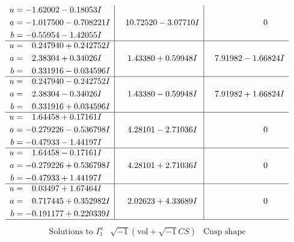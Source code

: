 \documentclass[1p]{elsarticle_modified}
\theoremstyle{definition}
\newcommand{\I}{\sqrt{-1}}
\begin{document}
$$\begin{array}{c|c|c}
\begin{aligned}
u &= -1.62002 - 0.18053 I \\
a &= -1.017500 - 0.708221 I \\
b &= -0.55954 - 1.42055 I\end{aligned}
 & \phantom{-}10.72520 - 3.07710 I & \phantom{-0.000000 } 0 \\ \hline\begin{aligned}
u &= \phantom{-}0.247940 + 0.242752 I \\
a &= \phantom{-}2.38304 + 0.34026 I \\
b &= \phantom{-}0.331916 - 0.034596 I\end{aligned}
 & \phantom{-}1.43380 + 0.59948 I & \phantom{-}7.91982 - 1.66824 I \\ \hline\begin{aligned}
u &= \phantom{-}0.247940 - 0.242752 I \\
a &= \phantom{-}2.38304 - 0.34026 I \\
b &= \phantom{-}0.331916 + 0.034596 I\end{aligned}
 & \phantom{-}1.43380 - 0.59948 I & \phantom{-}7.91982 + 1.66824 I \\ \hline\begin{aligned}
u &= \phantom{-}1.64458 + 0.17161 I \\
a &= -0.279226 - 0.536798 I \\
b &= -0.47933 - 1.44197 I\end{aligned}
 & \phantom{-}4.28101 - 2.71036 I & \phantom{-0.000000 } 0 \\ \hline\begin{aligned}
u &= \phantom{-}1.64458 - 0.17161 I \\
a &= -0.279226 + 0.536798 I \\
b &= -0.47933 + 1.44197 I\end{aligned}
 & \phantom{-}4.28101 + 2.71036 I & \phantom{-0.000000 } 0 \\ \hline\begin{aligned}
u &= \phantom{-}0.03497 + 1.67464 I \\
a &= \phantom{-}0.717445 + 0.352982 I \\
b &= -0.191177 + 0.220339 I\end{aligned}
 & \phantom{-}2.02623 + 4.33689 I & \phantom{-0.000000 } 0\\
 \hline 
 \end{array}$$\newpage$$\begin{array}{c|c|c}  
\text{Solutions to }I^u_{1}& \I (\text{vol} + \sqrt{-1}CS) & \text{Cusp shape}\\

\end{array}$$
\end{document}
